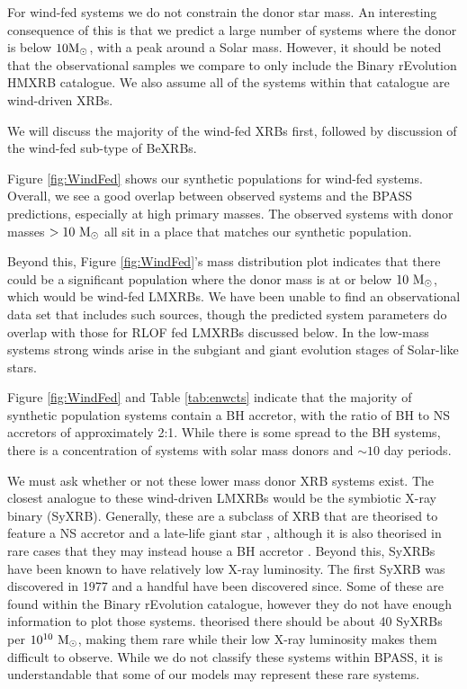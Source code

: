 \documentclass{pas}
\begin{document}
For wind-fed systems we do not constrain the donor star mass. An interesting consequence of this is that we predict a large number of systems where the donor is below $10\rm{M_{\odot}}$, with a peak around a Solar mass. However, it should be noted that the observational samples we compare to only include the Binary rEvolution HMXRB catalogue. We also assume all of the systems within that catalogue are wind-driven XRBs. 

We will discuss the majority of the wind-fed XRBs first, followed by discussion of the wind-fed sub-type of BeXRBs.

Figure \ref{fig:WindFed} shows our synthetic populations for wind-fed systems. Overall, we see a good overlap between observed systems and the \textsc{BPASS} predictions, especially at high primary masses. The observed systems with donor masses $>10~\rm{M_{\odot}}$ all sit in a place that matches our synthetic population. 

Beyond this, Figure \ref{fig:WindFed}'s mass distribution plot indicates that there could be a significant population where the donor mass is at or below $10~\rm{M_{\odot}}$, which would be wind-fed LMXRBs. We have been unable to find an observational data set that includes such sources, though the predicted system parameters do overlap with those for RLOF fed LMXRBs discussed below. In the low-mass systems strong winds arise in the subgiant and giant evolution stages of Solar-like stars.

Figure \ref{fig:WindFed} and Table \ref{tab:enwcts} indicate that the majority of synthetic population systems contain a BH accretor, with the ratio of BH to NS accretors of approximately 2:1. While there is some spread to the BH systems, there is a concentration of systems with solar mass donors and $\sim10$ day periods. 

We must ask whether or not these lower mass donor XRB systems exist. The closest analogue to these wind-driven LMXRBs would be the symbiotic X-ray binary (SyXRB). Generally, these are a subclass of XRB that are theorised to feature a NS accretor and a late-life giant star \citep{2012MNRAS.424.2265L,2019MNRAS.485..851Y}, although it is also theorised in rare cases that they may instead house a BH accretor \citep{2024ApJ...977...95D}. Beyond this, SyXRBs have been known to have relatively low X-ray luminosity. The first SyXRB was discovered in 1977 \citep{1977ApJ...211..866D} and a handful have been discovered since. Some of these are found within the Binary rEvolution catalogue, however they do not have enough information to plot those systems. \citet{2019MNRAS.485..851Y} theorised there should be about 40 SyXRBs per $10^{10}~\rm{M_{\odot}}$, making them rare while their low X-ray luminosity makes them difficult to observe. While we do not classify these systems within BPASS, it is understandable that some of our models may represent these rare systems. 
\end{document}
